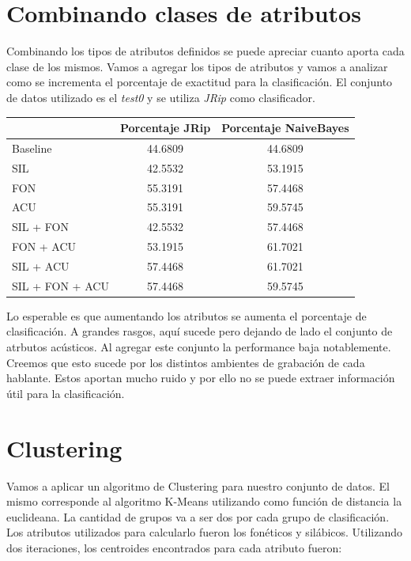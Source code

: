 \documentclass[11pt,a4paper,twoside]{tesis}
\begin{document}
\section{Combinando clases de atributos}

Combinando los tipos de atributos definidos se puede apreciar cuanto aporta cada clase de los mismos. Vamos a agregar los tipos de atributos y vamos a analizar como se incrementa el porcentaje de exactitud para la clasificación. El conjunto de datos utilizado es el \textit{test0} y se utiliza \textit{JRip} como clasificador.

\begin{table}[H]
\centering
\begin{tabular}{|l|c|c|}
\hline
\textbf{}  & \textbf{Porcentaje  JRip}  & \textbf{Porcentaje  NaiveBayes}   \\ \hline
Baseline & 44.6809 & 44.6809 \\ \hline
SIL & 42.5532 & 53.1915 \\ \hline
FON & 55.3191 & 57.4468 \\ \hline
ACU & 55.3191 & 59.5745 \\ \hline
SIL + FON & 42.5532 & 57.4468 \\ \hline
FON + ACU & 53.1915 & 61.7021 \\ \hline
SIL + ACU & 57.4468 &  61.7021 \\ \hline
SIL + FON + ACU & 57.4468 & 59.5745 \\ \hline
\end{tabular}
\end{table}

Lo esperable es que aumentando los atributos se aumenta el porcentaje de clasificación. A grandes rasgos, aquí sucede pero dejando de lado el conjunto de atrbutos acústicos. Al agregar este conjunto la performance baja notablemente. Creemos que esto sucede por los distintos ambientes de grabación de cada hablante. Estos aportan mucho ruido y por ello no se puede extraer información útil para la clasificación.

\section{Clustering}

Vamos a aplicar un algoritmo de Clustering para nuestro conjunto de datos. El mismo corresponde al algoritmo K-Means utilizando como función de distancia la euclideana. La cantidad de grupos va a ser dos por cada grupo de clasificación. Los atributos utilizados para calcularlo fueron los fonéticos y silábicos. Utilizando dos iteraciones, los centroides encontrados para cada atributo fueron:
\end{document}
